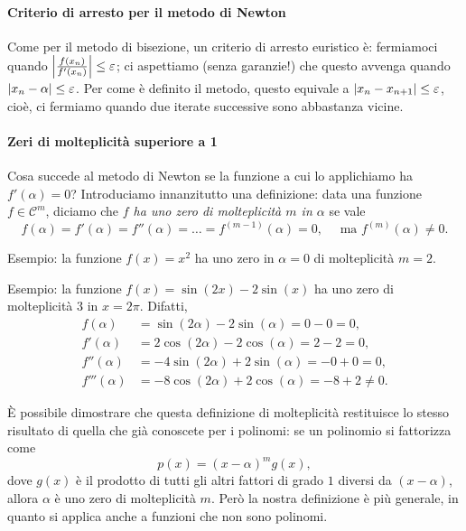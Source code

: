 \documentclass[a4paper]{report}
\DeclarePairedDelimiter{\abs}{\lvert}{\rvert}
\theoremstyle{definiton}
\theoremstyle{remark}
\begin{document}
\paragraph{Criterio di arresto per il metodo di Newton} Come per il metodo di bisezione, un criterio di arresto euristico è: fermiamoci quando $\abs*{\frac{f(x_n)}{f'(x_n)}} \leq \varepsilon$; ci aspettiamo (senza garanzie!) che questo avvenga quando $\abs{x_n - \alpha} \leq \varepsilon$. Per come è definito il metodo, questo equivale a $\abs{x_n - x_{n+1}} \leq \varepsilon$, cioè, ci fermiamo quando due iterate successive sono abbastanza vicine.

\paragraph{Zeri di molteplicità superiore a 1} Cosa succede al metodo di Newton se la funzione a cui lo applichiamo ha $f'(\alpha) = 0$? Introduciamo innanzitutto una definizione: data una funzione $f\in\mathcal{C}^m$, diciamo che \emph{$f$ ha uno zero di molteplicità $m$ in $\alpha$} se vale
\[
f(\alpha) = f'(\alpha) = f''(\alpha) = \dots = f^{(m-1)}(\alpha) = 0, \quad \text{ ma } f^{(m)}(\alpha) \neq 0.
\]

Esempio: la funzione $f(x)=x^2$ ha uno zero in $\alpha=0$ di molteplicità $m=2$.

Esempio: la funzione $f(x) = \sin(2x) - 2\sin(x)$ ha uno zero di molteplicità $3$ in $x=2\pi$. Difatti,
\begin{align*}
    f(\alpha) &= \sin(2\alpha) - 2\sin(\alpha) = 0 - 0 = 0,\\
    f'(\alpha) &= 2\cos(2\alpha) - 2\cos(\alpha) = 2 - 2 = 0,\\
    f''(\alpha) &= -4\sin(2\alpha) +2\sin(\alpha) = -0 + 0 = 0,\\
    f'''(\alpha) &= -8\cos(2\alpha) +2\cos(\alpha) = -8 + 2 \neq 0.
\end{align*}

È possibile dimostrare che questa definizione di molteplicità restituisce lo stesso risultato di quella che già conoscete per i polinomi: se un polinomio si fattorizza come
\[
    p(x) = (x-\alpha)^m g(x),
\]
dove $g(x)$ è il prodotto di tutti gli altri fattori di grado $1$ diversi da $(x-\alpha)$, allora $\alpha$ è uno zero di molteplicità $m$. Però la nostra definizione è più generale, in quanto si applica anche a funzioni che non sono polinomi.
\end{document}
